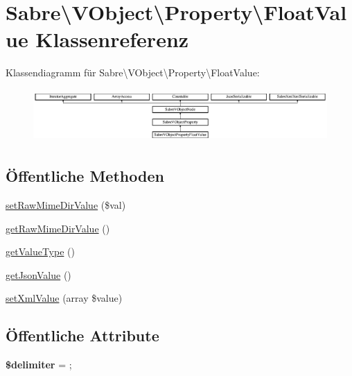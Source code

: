 \hypertarget{class_sabre_1_1_v_object_1_1_property_1_1_float_value}{}\section{Sabre\textbackslash{}V\+Object\textbackslash{}Property\textbackslash{}Float\+Value Klassenreferenz}
\label{class_sabre_1_1_v_object_1_1_property_1_1_float_value}
Klassendiagramm für Sabre\textbackslash{}V\+Object\textbackslash{}Property\textbackslash{}Float\+Value\+:\begin{figure}[H]
\begin{center}
\leavevmode
\includegraphics[height=2.018018cm]{class_sabre_1_1_v_object_1_1_property_1_1_float_value}
\end{center}
\end{figure}
\subsection*{Öffentliche Methoden}
\begin{DoxyCompactItemize}
\item 
\mbox{\hyperlink{class_sabre_1_1_v_object_1_1_property_1_1_float_value_a286814db0ec9bcd65ea832402a583e65}{set\+Raw\+Mime\+Dir\+Value}} (\$val)
\item 
\mbox{\hyperlink{class_sabre_1_1_v_object_1_1_property_1_1_float_value_ad40b098ef6a5d1c78c951744053b8565}{get\+Raw\+Mime\+Dir\+Value}} ()
\item 
\mbox{\hyperlink{class_sabre_1_1_v_object_1_1_property_1_1_float_value_af8bf98cfa2baca94e60130547a5038f6}{get\+Value\+Type}} ()
\item 
\mbox{\hyperlink{class_sabre_1_1_v_object_1_1_property_1_1_float_value_aabf78b1baddaa8430aac6eb33e901a0b}{get\+Json\+Value}} ()
\item 
\mbox{\hyperlink{class_sabre_1_1_v_object_1_1_property_1_1_float_value_aa8fd2f134179b3cdc6b38518d9ddbac1}{set\+Xml\+Value}} (array \$value)
\end{DoxyCompactItemize}
\subsection*{Öffentliche Attribute}
\begin{DoxyCompactItemize}
\item 
\mbox{\label{class_sabre_1_1_v_object_1_1_property_1_1_float_value_a182c8f880ee9e51a35d40b1b833b9416}} 
{\bfseries \$delimiter} = \textquotesingle{};\textquotesingle{}
\end{DoxyCompactItemize}
